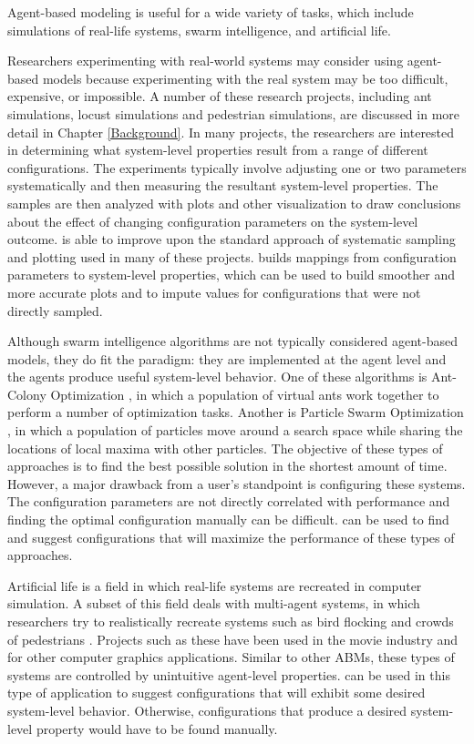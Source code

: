 Agent-based modeling is useful for a wide variety of tasks, which include simulations of real-life systems, swarm intelligence, and artificial life.

Researchers experimenting with real-world systems may consider using agent-based models because experimenting with the real system may be too difficult, expensive, or impossible.
A number of these research projects, including ant simulations, locust simulations and pedestrian simulations, are discussed in more detail in Chapter \ref{Background}.
In many projects, the researchers are interested in determining what system-level properties result from a range of different configurations.
The experiments typically involve adjusting one or two parameters systematically and then measuring the resultant system-level properties.
The samples are then analyzed with plots and other visualization to draw conclusions about the effect of changing configuration parameters on the system-level outcome.
\fw is able to improve upon the standard approach of systematic sampling and plotting used in many of these projects.
\fw builds mappings from configuration parameters to system-level properties, which can be used to build smoother and more accurate plots and to impute values for configurations that were not directly sampled.

Although swarm intelligence algorithms are not typically considered agent-based models, they do fit the paradigm: they are implemented at the agent level and the agents produce useful system-level behavior.
One of these algorithms is Ant-Colony Optimization \cite{dorigo2004aco}, in which a population of virtual ants work together to perform a number of optimization tasks.
Another is Particle Swarm Optimization \cite{kennedy1995pso}, in which a population of particles move around a search space while sharing the locations of local maxima with other particles.
The objective of these types of approaches is to find the best possible solution in the shortest amount of time.
However, a major drawback from a user's standpoint is configuring these systems.
The configuration parameters are not directly correlated with performance and finding the optimal configuration manually can be difficult.
\fw can be used to find and suggest configurations that will maximize the performance of these types of approaches.

Artificial life is a field in which real-life systems are recreated in computer simulation.
A subset of this field deals with multi-agent systems, in which researchers try to realistically recreate systems such as bird flocking \cite{reynolds1987} and crowds of pedestrians \cite{shao2007autonomous}\cite{pelechano2007controlling}.
Projects such as these have been used in the movie industry \cite{maes1995artificial} and for other computer graphics applications.
Similar to other ABMs, these types of systems are controlled by unintuitive agent-level properties.
\fw can be used in this type of application to suggest configurations that will exhibit some desired system-level behavior.
Otherwise, configurations that produce a desired system-level property would have to be found manually.

